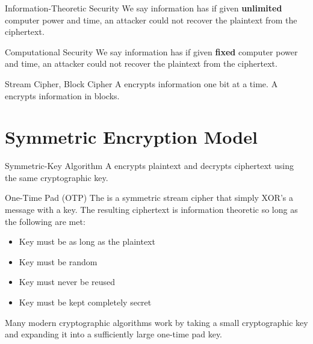 \documentclass[12pt]{report}
\begin{document}
\begin{dfnbox}{Information-Theoretic Security}{}
    We say information has  if given \textbf{unlimited} computer power and time, an attacker could not recover the plaintext from the ciphertext.
\end{dfnbox}

\begin{dfnbox}{Computational Security}{}
    We say information has  if given \textbf{fixed} computer power and time, an attacker could not recover the plaintext from the ciphertext.
\end{dfnbox}

\begin{dfnbox}{Stream Cipher, Block Cipher}{}
    A  encrypts information one bit at a time.     A  encrypts information in blocks.
\end{dfnbox}

\section{Symmetric Encryption Model}

\begin{dfnbox}{Symmetric-Key Algorithm}{}
    A  encrypts plaintext and decrypts ciphertext using the same cryptographic key.
\end{dfnbox}

\begin{dfnbox}{One-Time Pad (OTP)}{}
    The  is a symmetric stream cipher that simply XOR's a message with a key. The resulting ciphertext is information theoretic so long as the following are met:
    \begin{itemize}[noitemsep]
        \item Key must be as long as the plaintext
        \item Key must be random
        \item Key must never be reused
        \item Key must be kept completely secret
   \end{itemize}
\end{dfnbox}

Many modern cryptographic algorithms work by taking a small cryptographic key and expanding it into a sufficiently large one-time pad key.
\end{document}
